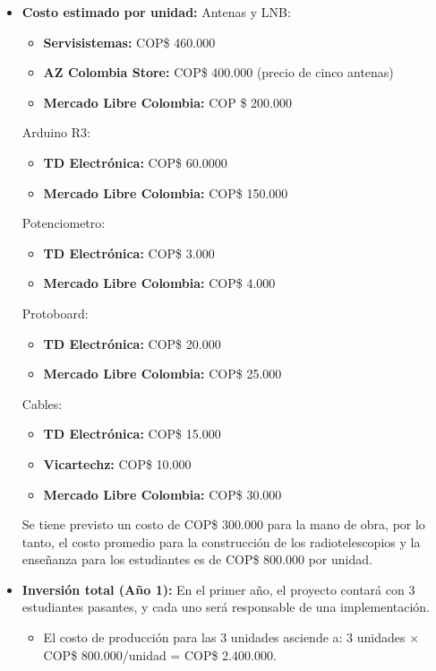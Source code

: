 \begin{itemize}
    \item \textbf{Costo estimado por unidad:}
    Antenas y LNB:                                        
		\begin{itemize}
        \item \textbf{Servisistemas:} COP\$ 460.000
        \item \textbf{AZ Colombia Store:} COP\$ 400.000 (precio de cinco antenas)     
        \item \textbf{{Mercado Libre Colombia:}} COP \$ 200.000
    \end{itemize}
    Arduino R3:           
    \begin{itemize}
        \item \textbf{TD Electrónica:} COP\$ 60.0000
        \item \textbf{Mercado Libre Colombia:} COP\$ 150.000
    \end{itemize}                                                      
		Potenciometro:                                                     
		\begin{itemize}
        \item \textbf{TD Electrónica:} COP\$ 3.000
        \item \textbf{Mercado Libre Colombia:} COP\$ 4.000
    \end{itemize}                                                      
		Protoboard:
    \begin{itemize}
        \item \textbf{TD Electrónica:} COP\$ 20.000
        \item \textbf{Mercado Libre Colombia:} COP\$ 25.000
    \end{itemize}       
    Cables:                                                           
    \begin{itemize}
        \item \textbf{TD Electrónica:} COP\$ 15.000
        \item \textbf{Vicartechz:} COP\$ 10.000
        \item \textbf{Mercado Libre Colombia:} COP\$ 30.000
    \end{itemize}

		Se tiene previsto un costo de COP\$ 300.000 para la mano de obra, por lo 
		tanto, el costo promedio para la construcción de los radiotelescopios y la 
		enseñanza para los estudiantes es de COP\$ 800.000 por unidad.
   
    \item \textbf{Inversión total (Año 1):} En el primer año, el proyecto 
			contará con 3 estudiantes pasantes, y cada uno será responsable de una 
			implementación.
    \begin{itemize}
        \item El costo de producción para las 3 unidades asciende a: 
					3 unidades $\times$ COP\$ 800.000/unidad = COP\$ 2.400.000.
    \end{itemize}
\end{itemize}

